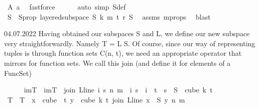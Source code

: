 \begin{isabellebody}
\ A\ a\ \isamarkupfalse%
\ fastforce\isanewline
\ \ \ \ \isamarkupfalse%
\ {\isacharparenleft}{\kern0pt}auto\ simp{\isacharcolon}{\kern0pt}\ {\isasymchi}S{\isacharunderscore}{\kern0pt}def{\isacharparenright}{\kern0pt}\isanewline
\ \ \ \ \ \ \isanewline
\ \ \ \ \isamarkupfalse%
\ \isamarkupfalse%
\ S\ \ S{\isacharunderscore}{\kern0pt}prop{\isacharcolon}{\kern0pt}\ {\isachardoublequoteopen}layered{\isacharunderscore}{\kern0pt}subspace\ S\ k\ m\ t\ r\ {\isasymchi}S{\isachardoublequoteclose}\ \isamarkupfalse%
\ assms{\isacharparenleft}{\kern0pt}{}{\isacharparenright}{\kern0pt}\ m{\isacharunderscore}{\kern0pt}props\ \isamarkupfalse%
\ blast%
\begin{isamarkuptext}%
04.07.2022 Having obtained our subspaces S and L, we define our new subspace very straightforwardly. Namely T = L \times S. Of course, since our way of representing tuples is through function sets C(n, t), we need an appropriate operator that mirrors \times for function sets. We call this join (and define it for elements of a FuncSet)%
\end{isamarkuptext}\isamarkuptrue%
\ \ \ \ \isamarkupfalse%
\ imT\ \ {\isachardoublequoteopen}imT\ {\isasymequiv}\ {\isacharbraceleft}{\kern0pt}join\ {\isacharparenleft}{\kern0pt}L{\isacharunderscore}{\kern0pt}line\ i{\isacharparenright}{\kern0pt}\ s\ n\ m\ {\isacharbar}{\kern0pt}\ i\ s\ {\isachardot}{\kern0pt}\ i\ {\isasymin}\ {\isacharbraceleft}{\kern0pt}{\isachardot}{\kern0pt}{\isachardot}{\kern0pt}{\isacharless}{\kern0pt}t{\isacharplus}{\kern0pt}{}{\isacharbraceright}{\kern0pt}\ {\isasymand}\ s\ {\isasymin}\ S\ {\isacharbackquote}{\kern0pt}\ {\isacharparenleft}{\kern0pt}cube\ k\ {\isacharparenleft}{\kern0pt}t{\isacharplus}{\kern0pt}{}{\isacharparenright}{\kern0pt}{\isacharparenright}{\kern0pt}{\isacharbraceright}{\kern0pt}{\isachardoublequoteclose}\ \isanewline
\ \ \ \ \isamarkupfalse%
\ T{\isacharprime}{\kern0pt}\ \ {\isachardoublequoteopen}T{\isacharprime}{\kern0pt}\ {\isasymequiv}\ {\isacharparenleft}{\kern0pt}{\isasymlambda}x\ {\isasymin}\ cube\ {}\ {\isacharparenleft}{\kern0pt}t{\isacharplus}{\kern0pt}{}{\isacharparenright}{\kern0pt}{\isachardot}{\kern0pt}\ {\isasymlambda}y\ {\isasymin}\ cube\ k\ {\isacharparenleft}{\kern0pt}t{\isacharplus}{\kern0pt}{}{\isacharparenright}{\kern0pt}{\isachardot}{\kern0pt}\ join\ {\isacharparenleft}{\kern0pt}L{\isacharunderscore}{\kern0pt}line\ {\isacharparenleft}{\kern0pt}x\ {}{\isacharparenright}{\kern0pt}{\isacharparenright}{\kern0pt}\ {\isacharparenleft}{\kern0pt}S\ y{\isacharparenright}{\kern0pt}\ n\ m{\isacharparenright}{\kern0pt}{\isachardoublequoteclose}\isanewline

\end{isabellebody}
